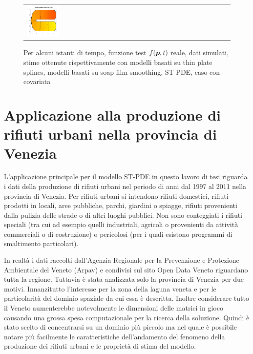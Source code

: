 \documentclass[a4paper,11pt,twoside,openright]{book}							%
\begin{document}
\begin{landscape}
\begin{figure}
\begin{tabular}{lccccc}
\includegraphics[trim=0cm 0cm 0cm 1.8cm,clip=true,width=0.19\textwidth,valign=t]{Immagini/simulazioni_covar/STSRtempo4.png}
\end{tabular}
\caption{Per alcuni istanti di tempo, funzione test $f(\protect\bm{p},t)$ reale, dati simulati, stime ottenute rispettivamente con modelli basati su thin plate splines, modelli basati su soap film smoothing, ST-PDE, caso con covariata}
\label{fig:confronto_altri_metodi_cov}
\end{figure}
\end{landscape}


\chapter{Applicazione alla produzione di rifiuti urbani nella provincia di Venezia}
\label{cap:rifiuti}

L'applicazione principale per il modello ST-PDE in questo lavoro di tesi riguarda i dati della produzione di rifiuti urbani nel periodo di anni dal 1997 al 2011 nella provincia di Venezia. Per rifiuti urbani si intendono rifiuti domestici, rifiuti prodotti in locali, aree pubbliche, parchi, giardini o spiagge, rifiuti provenienti dalla pulizia delle strade o di altri luoghi pubblici. Non sono conteggiati i rifiuti speciali (tra cui ad esempio quelli industriali, agricoli o provenienti da attività commerciali o di costruzione) o pericolosi (per i quali esistono programmi di smaltimento particolari).

In realtà i dati raccolti dall'Agenzia Regionale per la Prevenzione e Protezione Ambientale del Veneto (Arpav) e condivisi sul sito Open Data Veneto riguardano tutta la regione. Tuttavia è stata analizzata solo la provincia di Venezia per due motivi. Innanzitutto l'interesse per la zona della laguna veneta e per le particolarità del dominio spaziale da cui essa è descritta. Inoltre considerare tutto il Veneto aumenterebbe notevolmente le dimensioni delle matrici in gioco causando una grossa spesa computazionale per la ricerca della soluzione. Quindi è stato scelto di concentrarsi su un dominio più piccolo ma nel quale è possibile notare più facilmente le caratteristiche dell'andamento del fenomeno della produzione dei rifiuti urbani e le proprietà di stima del modello.
\end{document}
